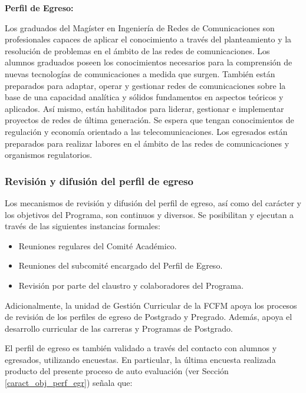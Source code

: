 \noindent\textbf{Perfil de Egreso:}

Los graduados del Magíster en Ingeniería de Redes de Comunicaciones son profesionales capaces 
de aplicar el conocimiento a través del planteamiento y la resolución de problemas en el ámbito 
de las redes de comunicaciones. Los alumnos graduados poseen los conocimientos necesarios para 
la comprensión de nuevas tecnologías de comunicaciones a medida que surgen. También están preparados 
para adaptar, operar y gestionar redes de comunicaciones sobre la base de una capacidad analítica y 
sólidos fundamentos en aspectos teóricos y aplicados. Así mismo, están habilitados para liderar, 
gestionar e implementar proyectos de redes de última generación. Se espera que tengan conocimientos 
de regulación y economía orientado a las telecomunicaciones. Los egresados están preparados para 
realizar labores en el ámbito de las redes de comunicaciones y organismos regulatorios. 


\subsubsection{Revisión y difusión del perfil de egreso}

Los mecanismos de revisión y difusión del perfil de egreso, así como del carácter y los objetivos del
Programa, son continuos y diversos. Se posibilitan y ejecutan a través de las siguientes instancias
formales:

\begin{itemize}
\item Reuniones regulares del Comité Académico. 
\item Reuniones del subcomité encargado del Perfil de Egreso.
\item Revisión por parte del claustro y colaboradores del Programa.
\end{itemize}

Adicionalmente, la unidad de Gestión Curricular de la FCFM apoya los procesos de revisión
de los perfiles de egreso de Postgrado y Pregrado. Además, apoya el desarrollo curricular de las
carreras y Programas de Postgrado.

El perfil de egreso es también validado a través del contacto con alumnos y egresados,
utilizando encuestas. En particular, la última encuesta realizada producto del presente proceso
de auto evaluación (ver Sección \ref{caract_obj_perf_egr}) señala que:

